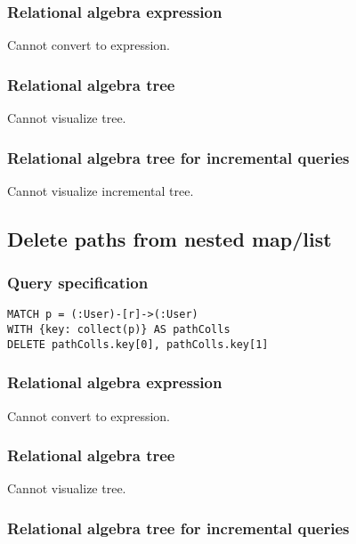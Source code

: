 \subsubsection*{Relational algebra expression}

Cannot convert to expression.

\subsubsection*{Relational algebra tree}

Cannot visualize tree.

\subsubsection*{Relational algebra tree for incremental queries}

Cannot visualize incremental tree.

\subsection{Delete paths from nested map/list}

\subsubsection*{Query specification}

\begin{lstlisting}
MATCH p = (:User)-[r]->(:User)
WITH {key: collect(p)} AS pathColls
DELETE pathColls.key[0], pathColls.key[1]
\end{lstlisting}

\subsubsection*{Relational algebra expression}

Cannot convert to expression.

\subsubsection*{Relational algebra tree}

Cannot visualize tree.

\subsubsection*{Relational algebra tree for incremental queries}

